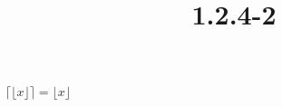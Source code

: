 \documentclass{article}
\title{1.2.4-2}
\begin{document}
\maketitle

\( \lceil \lfloor x \rfloor \rceil = \lfloor x \rfloor \)
\end{document}
